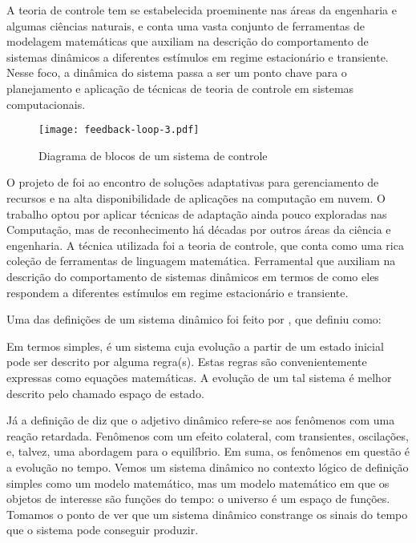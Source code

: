 A teoria de controle tem se estabelecida proeminente nas áreas da engenharia e algumas ciências naturais, e conta uma vasta conjunto de ferramentas de modelagem matemáticas que auxiliam na descrição do comportamento de sistemas dinâmicos a diferentes estímulos em regime estacionário e transiente. Nesse foco, a dinâmica do sistema passa a ser um ponto chave para o planejamento e aplicação de técnicas de teoria de controle em sistemas computacionais. 

\begin{figure}[htb]	
	\centering
	\texttt{[image: feedback-loop-3.pdf]}
	\caption{Diagrama de blocos de um sistema de controle}
	\label{fig:feedback-nobile}	
\end{figure}

O projeto de  foi ao encontro de soluções adaptativas para gerenciamento de recursos e na alta disponibilidade de aplicações na computação em nuvem. O trabalho optou por aplicar técnicas de adaptação ainda pouco exploradas nas Computação, mas de reconhecimento há décadas por outros áreas da ciência e engenharia. A técnica utilizada foi a teoria de controle, que conta como uma rica coleção de ferramentas de linguagem matemática. Ferramental que auxiliam na descrição do comportamento de sistemas dinâmicos em termos de como eles respondem a diferentes estímulos em regime estacionário e transiente.

Uma das definições de um sistema dinâmico foi feito por , que definiu como:
\begin{citacao}
	Em termos simples, é um sistema cuja evolução a partir de um estado inicial pode ser descrito por alguma regra(s). Estas regras são convenientemente expressas como equações matemáticas. A evolução de um tal sistema é melhor descrito pelo chamado espaço de estado.
\end{citacao}

Já a definição de  diz que o adjetivo dinâmico refere-se aos fenômenos com uma reação retardada. Fenômenos com um efeito colateral, com transientes, oscilações, e, talvez, uma abordagem para o equilíbrio. Em suma, os fenômenos em questão é a evolução no tempo. Vemos um sistema dinâmico no contexto lógico de definição simples como um modelo matemático, mas um modelo matemático em que os objetos de interesse são funções do tempo: o universo é um espaço de funções. Tomamos o ponto de ver que um sistema dinâmico constrange os sinais do tempo que o sistema pode conseguir produzir.

